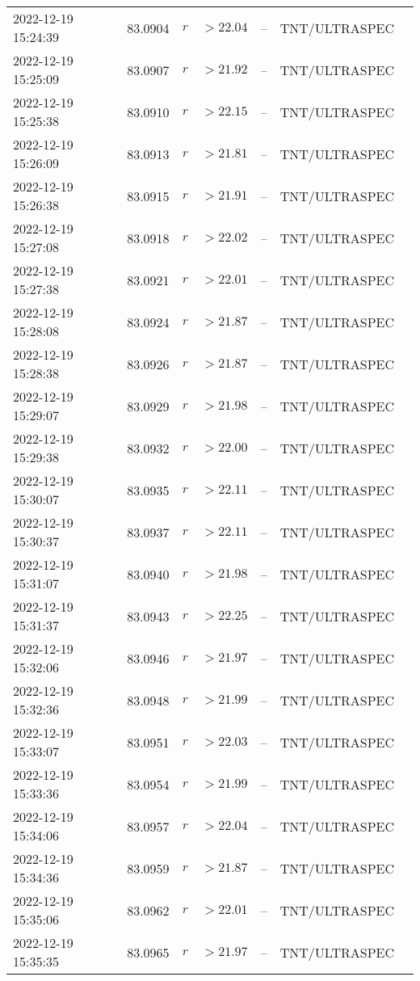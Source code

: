 \documentclass{nature_plusfigure}
\begin{document}
\begin{supplement}
\begin{center}
\begin{longtable}{lllllll}
2022-12-19 15:24:39 & 83.0904 & $r$ & $>22.04$ & -- & TNT/ULTRASPEC &  \\ 
2022-12-19 15:25:09 & 83.0907 & $r$ & $>21.92$ & -- & TNT/ULTRASPEC &  \\ 
2022-12-19 15:25:38 & 83.0910 & $r$ & $>22.15$ & -- & TNT/ULTRASPEC &  \\ 
2022-12-19 15:26:09 & 83.0913 & $r$ & $>21.81$ & -- & TNT/ULTRASPEC &  \\ 
2022-12-19 15:26:38 & 83.0915 & $r$ & $>21.91$ & -- & TNT/ULTRASPEC &  \\ 
2022-12-19 15:27:08 & 83.0918 & $r$ & $>22.02$ & -- & TNT/ULTRASPEC &  \\ 
2022-12-19 15:27:38 & 83.0921 & $r$ & $>22.01$ & -- & TNT/ULTRASPEC &  \\ 
2022-12-19 15:28:08 & 83.0924 & $r$ & $>21.87$ & -- & TNT/ULTRASPEC &  \\ 
2022-12-19 15:28:38 & 83.0926 & $r$ & $>21.87$ & -- & TNT/ULTRASPEC &  \\ 
2022-12-19 15:29:07 & 83.0929 & $r$ & $>21.98$ & -- & TNT/ULTRASPEC &  \\ 
2022-12-19 15:29:38 & 83.0932 & $r$ & $>22.00$ & -- & TNT/ULTRASPEC &  \\ 
2022-12-19 15:30:07 & 83.0935 & $r$ & $>22.11$ & -- & TNT/ULTRASPEC &  \\ 
2022-12-19 15:30:37 & 83.0937 & $r$ & $>22.11$ & -- & TNT/ULTRASPEC &  \\ 
2022-12-19 15:31:07 & 83.0940 & $r$ & $>21.98$ & -- & TNT/ULTRASPEC &  \\ 
2022-12-19 15:31:37 & 83.0943 & $r$ & $>22.25$ & -- & TNT/ULTRASPEC &  \\ 
2022-12-19 15:32:06 & 83.0946 & $r$ & $>21.97$ & -- & TNT/ULTRASPEC &  \\ 
2022-12-19 15:32:36 & 83.0948 & $r$ & $>21.99$ & -- & TNT/ULTRASPEC &  \\ 
2022-12-19 15:33:07 & 83.0951 & $r$ & $>22.03$ & -- & TNT/ULTRASPEC &  \\ 
2022-12-19 15:33:36 & 83.0954 & $r$ & $>21.99$ & -- & TNT/ULTRASPEC &  \\ 
2022-12-19 15:34:06 & 83.0957 & $r$ & $>22.04$ & -- & TNT/ULTRASPEC &  \\ 
2022-12-19 15:34:36 & 83.0959 & $r$ & $>21.87$ & -- & TNT/ULTRASPEC &  \\ 
2022-12-19 15:35:06 & 83.0962 & $r$ & $>22.01$ & -- & TNT/ULTRASPEC &  \\ 
2022-12-19 15:35:35 & 83.0965 & $r$ & $>21.97$ & -- & TNT/ULTRASPEC &  \\ 

\end{longtable}
\end{center}
\end{supplement}
\end{document}
